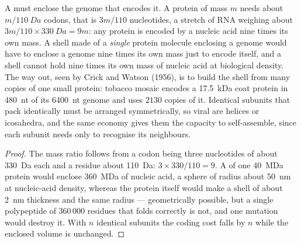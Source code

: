 \begin{proposition}\label{prop:b3:virology:economy}
A  must enclose the genome that encodes it. A protein of mass
$m$ needs about $m/\qty{110}{Da}$ codons, that is $3m/110$ nucleotides,
a stretch of RNA weighing about $3m/110\times\qty{330}{Da} = 9m$: any
protein is encoded by a nucleic acid nine times its own mass. A shell
made of a \emph{single} protein molecule enclosing a genome would have
to enclose a genome nine times its own mass just to encode itself, and
a shell cannot hold nine times its own mass of nucleic acid at
biological density. The way out, seen by Crick and Watson (1956), is to
build the shell from many copies of one small protein: tobacco mosaic
 encodes a \qty{17.5}{kDa} coat protein in \qty{480}{nt} of its
\qty{6400}{nt} genome and uses $2130$ copies of it. Identical subunits
that pack identically must be arranged symmetrically, so viral 
are helices or icosahedra, and the same economy gives them the
capacity to self-assemble, since each subunit needs only to recognise
its neighbours.
\end{proposition}
\begin{proof}
The mass ratio follows from a codon being three nucleotides of about
\qty{330}{Da} each and a residue about \qty{110}{Da}: $3\times 330/110 =
9$. A  of one \qty{40}{MDa} protein would enclose \qty{360}{MDa}
of nucleic acid, a sphere of radius about \qty{50}{nm} at nucleic-acid
density, whereas the protein itself would make a shell of about
\qty{2}{nm} thickness and the same radius --- geometrically possible,
but a single polypeptide of $360\,000$ residues that folds correctly is
not, and one mutation would destroy it. With $n$ identical subunits the
coding cost falls by $n$ while the enclosed volume is unchanged.
\end{proof}

